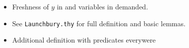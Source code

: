 \documentclass{beamer}
\begin{document}
\begin{frame}
\begin{itemize}
\begin{isabelle}
[..]
\end{isabelle}

\item Freshness of $y$ in  and variables in  demanded.
\item See \texttt{Launchbury.thy} for full definition and basic lemmas.
\item Additional definition with  predicates everywere
\end{itemize}

\end{frame}
\end{document}
